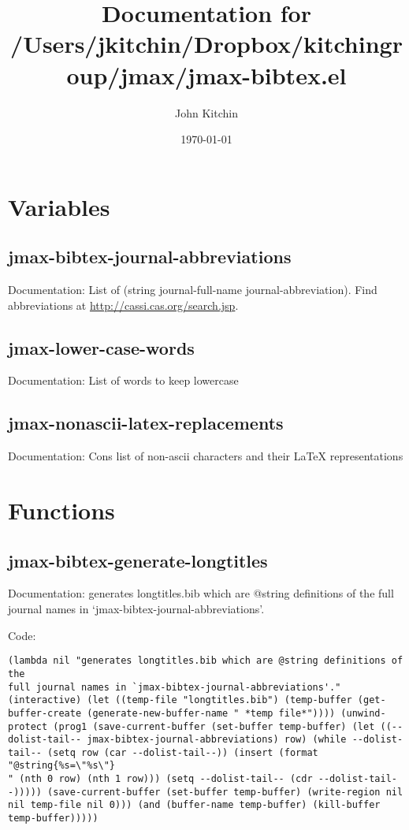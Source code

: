 \documentclass[11pt]{article}
\author{John Kitchin}
\date{\today}
\title{Documentation for /Users/jkitchin/Dropbox/kitchingroup/jmax/jmax-bibtex.el}
\begin{document}
\maketitle
\tableofcontents
\section{Variables}
\label{sec-1}
\subsection{jmax-bibtex-journal-abbreviations}
\label{sec-1-1}
Documentation: List of (string journal-full-name journal-abbreviation). Find abbreviations at \url{http://cassi.cas.org/search.jsp}.

\subsection{jmax-lower-case-words}
\label{sec-1-2}
Documentation: List of words to keep lowercase

\subsection{jmax-nonascii-latex-replacements}
\label{sec-1-3}
Documentation: Cons list of non-ascii characters and their \LaTeX{} representations

\section{Functions}
\label{sec-2}

\subsection{jmax-bibtex-generate-longtitles}
\label{sec-2-1}
Documentation: generates longtitles.bib which are @string definitions of the
full journal names in `jmax-bibtex-journal-abbreviations'.

Code:
\begin{verbatim}
(lambda nil "generates longtitles.bib which are @string definitions of the
full journal names in `jmax-bibtex-journal-abbreviations'." (interactive) (let ((temp-file "longtitles.bib") (temp-buffer (get-buffer-create (generate-new-buffer-name " *temp file*")))) (unwind-protect (prog1 (save-current-buffer (set-buffer temp-buffer) (let ((--dolist-tail-- jmax-bibtex-journal-abbreviations) row) (while --dolist-tail-- (setq row (car --dolist-tail--)) (insert (format "@string{%s=\"%s\"}
" (nth 0 row) (nth 1 row))) (setq --dolist-tail-- (cdr --dolist-tail--))))) (save-current-buffer (set-buffer temp-buffer) (write-region nil nil temp-file nil 0))) (and (buffer-name temp-buffer) (kill-buffer temp-buffer)))))
\end{verbatim}
\end{document}
